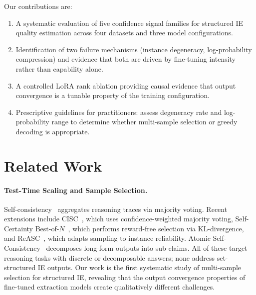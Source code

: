 \documentclass[11pt,a4paper]{article}
\begin{document}
Our contributions are:
\begin{enumerate}
\item A systematic evaluation of five confidence signal families for structured IE quality estimation across four datasets and three model configurations.
\item Identification of two failure mechanisms (instance degeneracy, log-probability compression) and evidence that both are driven by fine-tuning intensity rather than capability alone.
\item A controlled LoRA rank ablation providing causal evidence that output convergence is a tunable property of the training configuration.
\item Prescriptive guidelines for practitioners: assess degeneracy rate and log-probability range to determine whether multi-sample selection or greedy decoding is appropriate.
\end{enumerate}

\section{Related Work}

\paragraph{Test-Time Scaling and Sample Selection.}
Self-consistency~\citep{wang2023selfconsistency} aggregates reasoning traces via majority voting.
Recent extensions include CISC~\citep{cisc2025acl}, which uses confidence-weighted majority voting, Self-Certainty Best-of-$N$~\citep{selfcertainty2026iclr}, which performs reward-free selection via KL-divergence, and ReASC~\citep{reasc2026}, which adapts sampling to instance reliability.
Atomic Self-Consistency~\citep{atomicsc2024emnlp} decomposes long-form outputs into sub-claims.
All of these target reasoning tasks with discrete or decomposable answers; none address set-structured IE outputs.
Our work is the first systematic study of multi-sample selection for structured IE, revealing that the output convergence properties of fine-tuned extraction models create qualitatively different challenges.
\end{document}
